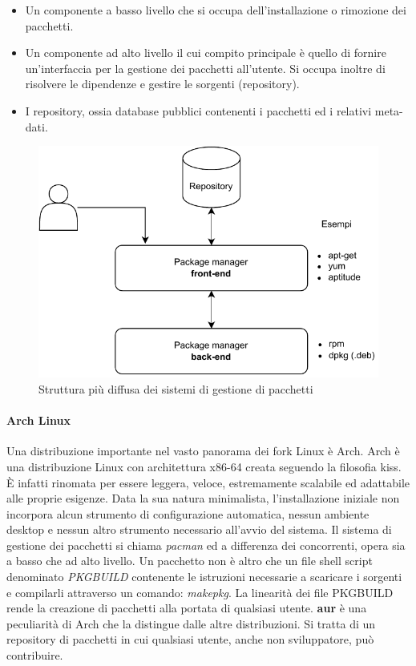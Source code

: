 \begin{itemize}
	\item Un componente a basso livello che si occupa dell'installazione o rimozione dei pacchetti.
	\item Un componente ad alto livello il cui compito principale è quello di fornire un'interfaccia per la gestione dei pacchetti all'utente. Si occupa inoltre di risolvere le dipendenze e gestire le sorgenti (repository).
	\item I repository, ossia database pubblici contenenti i pacchetti ed i relativi meta-dati.
\end{itemize}

\begin{figure}[H]
	\centering
	\includegraphics[width=.7\linewidth]{figures/package-managers.pdf}
	\caption{Struttura più diffusa dei sistemi di gestione di pacchetti}
	\label{fig:package-managers}
\end{figure}

\paragraph{Arch Linux} Una distribuzione importante nel vasto panorama dei fork Linux è Arch. Arch è una distribuzione Linux con architettura x86-64 creata seguendo la filosofia \ac{kiss}. È infatti rinomata per essere leggera, veloce, estremamente scalabile ed adattabile alle proprie esigenze. Data la sua natura minimalista, l'installazione iniziale non incorpora alcun strumento di configurazione automatica, nessun ambiente desktop e nessun altro strumento necessario all'avvio del sistema. Il sistema di gestione dei pacchetti si chiama \textit{pacman} ed a differenza dei concorrenti, opera sia a basso che ad alto livello. Un pacchetto non è altro che un file shell script denominato \textit{PKGBUILD} contenente le istruzioni necessarie a scaricare i sorgenti e compilarli attraverso un comando: \textit{makepkg}. La linearità dei file PKGBUILD rende la creazione di pacchetti alla portata di qualsiasi utente. \textbf{\ac{aur}} è una peculiarità di Arch che la distingue dalle altre distribuzioni. Si tratta di un repository di pacchetti in cui qualsiasi utente, anche non sviluppatore, può contribuire. 

